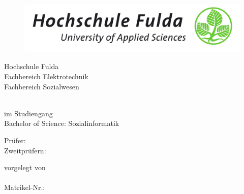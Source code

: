 \begin{titlepage}
\begin{figure}
  \centering
  \includegraphics[width=1.0\textwidth]{res/hs_fulda_logo_ntr.jpg}
\end{figure}
    \centering
    Hochschule Fulda \\    Fachbereich Elektrotechnik \\ Fachbereich Sozialwesen
    \vspace{1.5cm}

    {\Huge \bfseries \titel \par}
    {\Large \itshape \untertitel \par}
    \vspace{2.5cm}

    
    \modulname\\
    im Studiengang\\ Bachelor of Science: Sozialinformatik \\
    \vspace{0.7cm}


    \vspace{3cm}
    Prüfer: \pruefer\\
    Zweitprüfern: \zweitpruefer\\

    \vfill

    vorgelegt von \\ \vorname \nachname \\ Matrikel-Nr.: \matrikelnummer \\ \emailadresse \\ %
\restoregeometry
\end{titlepage}
